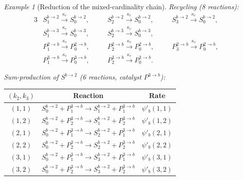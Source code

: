 \documentclass{article}
\theoremstyle{plain}
\theoremstyle{definition}
\theoremstyle{remark}
\newtheorem{example}{Example}[section]
\newcommand{\<}{\langle}
\renewcommand{\>}{\rangle}
\begin{document}
\begin{example}[Reduction of the mixed-cardinality chain]
\noindent\emph{Recycling (8 reactions):}
\begin{alignat*}{3}
&S^{b\to 2}_1 \xrightarrow{\kappa_r} S^{b\to 2}_0,\quad
&&S^{b\to 2}_2 \xrightarrow{\kappa_r} S^{b\to 2}_0,\quad
&&S^{b\to 2}_3 \xrightarrow{\kappa_r} S^{b\to 2}_0,
\\[2pt]
&S^{b\to 3}_1 \xrightarrow{\kappa_r} S^{b\to 3}_0,\quad
&&S^{b\to 3}_2 \xrightarrow{\kappa_r} S^{b\to 3}_0,
\\[2pt]
&P^{2\to b}_1 \xrightarrow{\kappa_r} P^{2\to b}_0,\quad
&&P^{2\to b}_2 \xrightarrow{\kappa_r} P^{2\to b}_0,\quad
&&P^{2\to b}_3 \xrightarrow{\kappa_r} P^{2\to b}_0,
\\[2pt]
&P^{3\to b}_1 \xrightarrow{\kappa_r} P^{3\to b}_0,\quad
&&P^{3\to b}_2 \xrightarrow{\kappa_r} P^{3\to b}_0.
\end{alignat*}
 
\noindent\emph{Sum-production of $S^{b\to 2}$ (6 reactions, catalyst $P^{3\to b}$):}
\begin{center}
\renewcommand{\arraystretch}{1.3}
\begin{tabular}{@{}ccc@{}}
\toprule
$(k_2,k_3)$ & Reaction & Rate \\
\midrule
$(1,1)$ & $S^{b\to 2}_0 + P^{3\to b}_1 \to S^{b\to 2}_1 + P^{3\to b}_1$ & $\psi'_b(1,1)$ \\
$(1,2)$ & $S^{b\to 2}_0 + P^{3\to b}_2 \to S^{b\to 2}_1 + P^{3\to b}_2$ & $\psi'_b(1,2)$ \\
$(2,1)$ & $S^{b\to 2}_0 + P^{3\to b}_1 \to S^{b\to 2}_2 + P^{3\to b}_1$ & $\psi'_b(2,1)$ \\
$(2,2)$ & $S^{b\to 2}_0 + P^{3\to b}_2 \to S^{b\to 2}_2 + P^{3\to b}_2$ & $\psi'_b(2,2)$ \\
$(3,1)$ & $S^{b\to 2}_0 + P^{3\to b}_1 \to S^{b\to 2}_3 + P^{3\to b}_1$ & $\psi'_b(3,1)$ \\
$(3,2)$ & $S^{b\to 2}_0 + P^{3\to b}_2 \to S^{b\to 2}_3 + P^{3\to b}_2$ & $\psi'_b(3,2)$ \\
\bottomrule
\end{tabular}
\end{center}
 

\end{example}
\end{document}
